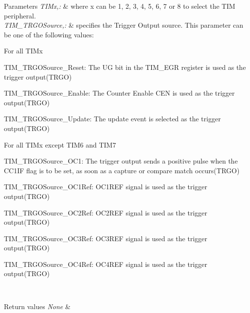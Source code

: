 \begin{DoxyParams}{Parameters}
{\em T\-I\-Mx,\-:} & where x can be 1, 2, 3, 4, 5, 6, 7 or 8 to select the T\-I\-M peripheral.\\
\hline
{\em T\-I\-M\-\_\-\-T\-R\-G\-O\-Source,\-:} & specifies the Trigger Output source. This parameter can be one of the following values\-:
\begin{DoxyItemize}
\item For all T\-I\-Mx \begin{DoxyItemize}
\item T\-I\-M\-\_\-\-T\-R\-G\-O\-Source\-\_\-\-Reset\-: The U\-G bit in the T\-I\-M\-\_\-\-E\-G\-R register is used as the trigger output(\-T\-R\-G\-O) \item T\-I\-M\-\_\-\-T\-R\-G\-O\-Source\-\_\-\-Enable\-: The Counter Enable C\-E\-N is used as the trigger output(\-T\-R\-G\-O) \item T\-I\-M\-\_\-\-T\-R\-G\-O\-Source\-\_\-\-Update\-: The update event is selected as the trigger output(\-T\-R\-G\-O)\end{DoxyItemize}

\item For all T\-I\-Mx except T\-I\-M6 and T\-I\-M7 \begin{DoxyItemize}
\item T\-I\-M\-\_\-\-T\-R\-G\-O\-Source\-\_\-\-O\-C1\-: The trigger output sends a positive pulse when the C\-C1\-I\-F flag is to be set, as soon as a capture or compare match occurs(\-T\-R\-G\-O) \item T\-I\-M\-\_\-\-T\-R\-G\-O\-Source\-\_\-\-O\-C1\-Ref\-: O\-C1\-R\-E\-F signal is used as the trigger output(\-T\-R\-G\-O) \item T\-I\-M\-\_\-\-T\-R\-G\-O\-Source\-\_\-\-O\-C2\-Ref\-: O\-C2\-R\-E\-F signal is used as the trigger output(\-T\-R\-G\-O) \item T\-I\-M\-\_\-\-T\-R\-G\-O\-Source\-\_\-\-O\-C3\-Ref\-: O\-C3\-R\-E\-F signal is used as the trigger output(\-T\-R\-G\-O) \item T\-I\-M\-\_\-\-T\-R\-G\-O\-Source\-\_\-\-O\-C4\-Ref\-: O\-C4\-R\-E\-F signal is used as the trigger output(\-T\-R\-G\-O)\end{DoxyItemize}

\end{DoxyItemize}\\
\hline
\end{DoxyParams}

\begin{DoxyRetVals}{Return values}
{\em None} & \\
\hline
\end{DoxyRetVals}


